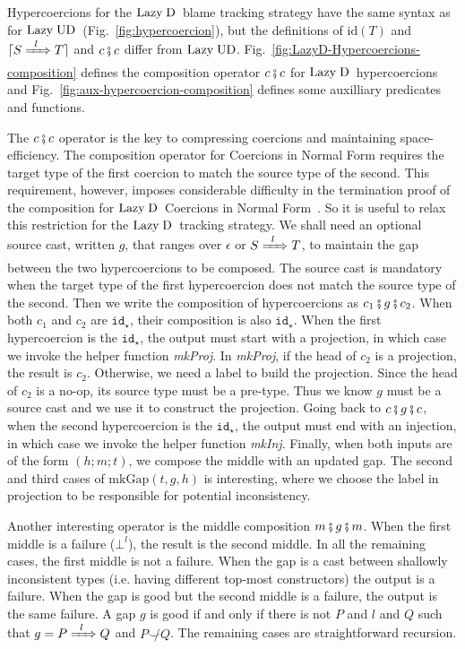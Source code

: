 \documentclass[runningheads]{llncs}
\newcommand{\figref}[1]{Fig.~\ref{#1}}
\newcommand{\LUD}{\ensuremath{\text{Lazy\;UD}}}
\newcommand{\LD}{\ensuremath{\text{Lazy\;D}}}
\newcommand{\Tdyn}[0]{\ensuremath{\star}}
\newcommand{\ccast}[3]{#1 \xRightarrow[]{\enskip #2 \enskip} #3}
\newcommand{\cnfid}[1]{\ensuremath{\mathtt{id}_{#1}}}
\newcommand{\hcci}[0]{\cnfid{\Tdyn}}
\newcommand{\hccc}[3]{\ensuremath{(#1;#2;#3)}}
\newcommand{\hcmfail}[1]{\ensuremath{\bot^l}}
\newcommand{\gnone}{\ensuremath{\epsilon}}
\newcommand{\gsome}[3]{\ccast{#1}{#2}{#3}}
\newcommand{\composegap}[3]{\ensuremath{#1 \fatsemi #2 \fatsemi #3}}
\newcommand{\mkgap}[3]{\ensuremath{\mathrm{mkGap}(#1,#2,#3)}}
\newcommand{\compose}[2]{\ensuremath{#1 \fatsemi #2}}
\newcommand{\translate}[1]{\ensuremath{\lceil#1\rceil}}
\newcommand{\id}[1]{\ensuremath{\mathrm{id}(#1)}}
\newcommand{\notshallowlyconsistent}[2]{\ensuremath{#1\not\smile#2}}
\begin{document}
Hypercoercions for the \LD\ blame tracking strategy have the same syntax
as for \LUD\ (\figref{fig:hypercoercion}), but the definitions of $\id{T}$ and
$\translate{\ccast{S}{l}{T}}$ and $\compose{c}{c}$ differ from \LUD.
%
\figref{fig:LazyD-Hypercoercions-composition} defines the composition
operator \compose{c}{c} for \LD\ hypercoercions and
\figref{fig:aux-hypercoercion-composition} defines some auxilliary
predicates and functions.

The \compose{c}{c} operator is the key to compressing coercions and
maintaining space-efficiency. The composition operator for Coercions
in Normal Form requires the target type of the first coercion to match
the source type of the second. This requirement, however, imposes
considerable difficulty in the termination proof of the composition
for \LD\ Coercions in Normal Form~\citep{almahallawi19}. So it is
useful to relax this restriction for the \LD\ tracking strategy.
%
We shall need an optional source cast, written $g$, that ranges over
$\gnone$ or $\gsome{S}{l}{T}$, to maintain the gap between the two
hypercoercions to be composed. The source cast is mandatory when the
target type of the first hypercoercion does not match the source type
of the second.  Then we write the composition of hypercoercions as
\composegap{c_1}{g}{c_2}.
%  
When both $c_1$ and $c_2$ are \hcci, their composition is also \hcci. 
%
When the first hypercoercion is the \hcci, the output must start with
a projection, in which case we invoke the helper function
\textit{mkProj}. In \textit{mkProj}, if the head of $c_2$ is a
projection, the result is $c_2$.  Otherwise, we need a label to build
the projection. Since the head of $c_2$ is a no-op, its source type
must be a pre-type. Thus we know $g$ must be a source cast and we use
it to construct the projection.
%
Going back to $\composegap{c}{g}{c}$, when the second hypercoercion is the 
\hcci, the output must end with an injection, in which case we invoke the 
helper function \textit{mkInj}.
%
Finally, when both inputs are of the form \hccc{h}{m}{t}, we compose the middle 
with an updated gap.
%
The second and third cases of \mkgap{t}{g}{h} is interesting, where we choose 
the label in projection to be responsible for potential inconsistency.

Another interesting operator is the middle composition \composegap{m}{g}{m}. 
%
When the first middle is a failure (\hcmfail{l}), the result is the second
middle. In all the remaining cases, the first middle is not a failure.
%
When the gap is a cast between shallowly inconsistent types (i.e. having 
different top-most constructors) the output is a failure.
%
When the gap is good but the second middle is a failure, the output is the same 
failure. A gap $g$ is good if and only if there is not $P$ and $l$ 
and $Q$ such that $g = \gsome{P}{l}{Q}$ and \notshallowlyconsistent{P}{Q}.
%
The remaining cases are straightforward recursion.
\end{document}
